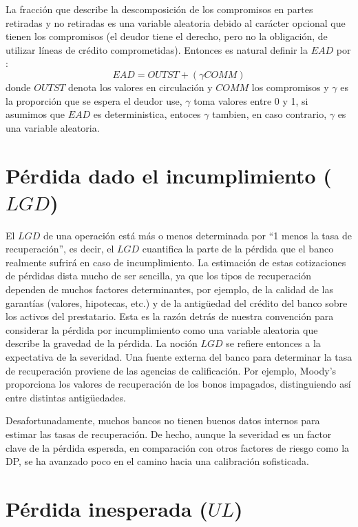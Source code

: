 \documentclass[
  12pt,
]{krantz}
\theoremstyle{definition}
\theoremstyle{definition}
\theoremstyle{definition}
\theoremstyle{remark}
\begin{document}
La fracción que describe la descomposición de los compromisos en partes retiradas y no retiradas es una variable aleatoria debido al carácter opcional que tienen los compromisos (el deudor tiene el derecho, pero no la obligación, de utilizar líneas de crédito comprometidas). Entonces es natural definir la \(EAD\) por : \[EAD=OUTST+(\gamma  COMM)\] donde \(OUTST\) denota los valores en circulación y \(COMM\) los compromisos y \(\gamma\) es la proporción que se espera el deudor use, \(\gamma\) toma valores entre 0 y 1, si asumimos que \(EAD\) es deterministica, entoces \(\gamma\) tambien, en caso contrario, \(\gamma\) es una variable aleatoria.

\hypertarget{perdida-dado-el-incumplimiento-lgd}{%
\section{\texorpdfstring{Pérdida dado el incumplimiento (\(LGD\))}{Pérdida dado el incumplimiento (LGD)}}\label{perdida-dado-el-incumplimiento-lgd}}

El \(LGD\) de una operación está más o menos determinada por ``1 menos la tasa de recuperación'', es decir, el \(LGD\) cuantifica la parte de la pérdida que el banco realmente sufrirá en caso de incumplimiento. La estimación de estas cotizaciones de pérdidas dista mucho de ser sencilla, ya que los tipos de recuperación dependen de muchos factores determinantes, por ejemplo, de la calidad de las garantías (valores, hipotecas, etc.) y de la antigüedad del crédito del banco sobre los activos del prestatario. Esta es la razón detrás de nuestra convención para considerar la pérdida por incumplimiento como una variable aleatoria que describe la gravedad de la pérdida. La noción \(LGD\) se refiere entonces a la expectativa de la severidad. Una fuente externa del banco para determinar la tasa de recuperación proviene de las agencias de calificación. Por ejemplo, Moody's proporciona los valores de recuperación de los bonos impagados, distinguiendo así entre distintas antigüedades.

Desafortunadamente, muchos bancos no tienen buenos datos internos para estimar las tasas de recuperación. De hecho, aunque la severidad es un factor clave de la pérdida espersda, en comparación con otros factores de riesgo como la DP, se ha avanzado poco en el camino hacia una calibración sofisticada.

\hypertarget{perdida-inesperada-ul}{%
\section{\texorpdfstring{Pérdida inesperada (\(UL\))}{Pérdida inesperada (UL)}}\label{perdida-inesperada-ul}}
\end{document}
